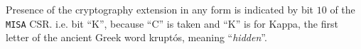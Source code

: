 
Presence of the cryptography extension in any form is indicated
by bit $10$ of the {\tt MISA} CSR.
i.e. bit ``K'', because ``C'' is taken and ``K'' is for Kappa, the
first letter of the ancient Greek word kruptós,
meaning ``{\em hidden}''.


